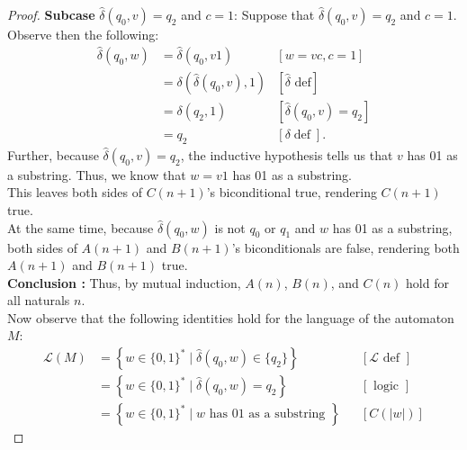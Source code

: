 \documentclass[10pt]{article}
\begin{document}
\begin{enumerate}[label={}]
\begin{proof}
                  \textbf{Subcase }$\hat{\delta}\left(q_0, v\right)=q_2$ and $c=1$: Suppose that $\hat{\delta}\left(q_0, v\right)=q_2$ and $c=1$. Observe then the following:
                  $$
                        \begin{aligned}
                              \hat{\delta}\left(q_0, w\right) & =\hat{\delta}\left(q_0, v 1\right)                     & {[w=v c, c=1] }                                     \\
                                                              & =\delta\left(\hat{\delta}\left(q_0, v\right), 1\right) & {[\hat{\delta} \text { def}] }                      \\
                                                              & =\delta\left(q_2, 1\right)                             & {\left[\hat{\delta}\left(q_0, v\right)=q_2\right] } \\
                                                              & =q_2                                                   & {[\delta \operatorname{def}] . }
                        \end{aligned}
                  $$
                  Further, because $\hat{\delta}\left(q_0, v\right)=q_2$, the inductive hypothesis tells us that $v$ has 01 as a substring. Thus, we know that $w=v1$ has 01 as a substring.\\
                  This leaves both sides of $C(n+1)$'s biconditional true, rendering $C(n+1)$ true.\\
                  At the same time, because $\hat{\delta}\left(q_0, w\right)$ is not $q_0$ or $q_1$ and $w$ has 01 as a substring, both sides of $A(n+1)$ and $B(n+1)$'s biconditionals are false, rendering both $A(n+1)$ and $B(n+1)$ true.\\
                  \textbf{Conclusion :} Thus, by mutual induction, $A(n)$, $B(n)$, and $C(n)$ hold for all naturals $n$.\\
                  Now observe that the following identities hold for the language of the automaton $M$:
                  $$
                        \begin{aligned}
                              \mathcal{L}(M) & =\left\{w \in\{0, 1\}^* \mid \hat{\delta}(q_0, w) \in\{q_2\}\right\}   &  & {[\mathcal{L} \text { def }] } \\
                                             & =\left\{w \in\{0, 1\}^* \mid \hat{\delta}(q_0, w)=q_2\right\}          &  & {[\text { logic }] }           \\
                                             & =\left\{w \in\{0, 1\}^* \mid w \text { has 01 as a substring }\right\} &  & {[C(|w|)] }
                        \end{aligned}
                  $$


\end{proof}
\end{enumerate}
\end{document}
